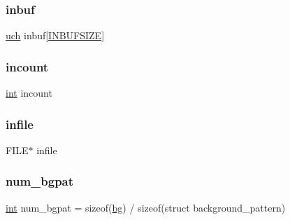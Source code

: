\mbox{\label{rpng2-x_8c_a82a0c3437e717af50ffb2c5244a611dd}} 
\subsubsection{\texorpdfstring{inbuf}{inbuf}}
{\footnotesize\ttfamily \mbox{\hyperlink{readpng_8h_af3307af5922c72924a837559c801a8a4}{uch}} inbuf\mbox{[}\mbox{\hyperlink{rpng2-x_8c_ab3f00dac33458432279d4308226d8413}{I\+N\+B\+U\+F\+S\+I\+ZE}}\mbox{]}\hspace{0.3cm}{\ttfamily [static]}}

\mbox{\label{rpng2-x_8c_aeb67c5d07a9a094de6dc172d6ef53766}} 
\subsubsection{\texorpdfstring{incount}{incount}}
{\footnotesize\ttfamily \mbox{\hyperlink{ioapi_8h_a787fa3cf048117ba7123753c1e74fcd6}{int}} incount\hspace{0.3cm}{\ttfamily [static]}}

\mbox{\label{rpng2-x_8c_af19157da745ecb3f2b088c8f3a10c0a7}} 
\subsubsection{\texorpdfstring{infile}{infile}}
{\footnotesize\ttfamily F\+I\+LE$\ast$ infile\hspace{0.3cm}{\ttfamily [static]}}

\mbox{\label{rpng2-x_8c_af61b351338b26840386fbab7f8214e53}} 
\subsubsection{\texorpdfstring{num\+\_\+bgpat}{num\_bgpat}}
{\footnotesize\ttfamily \mbox{\hyperlink{ioapi_8h_a787fa3cf048117ba7123753c1e74fcd6}{int}} num\+\_\+bgpat = sizeof(\mbox{\hyperlink{rpng2-x_8c_a808fa6d3573a86afa3ba7698a65b1ef6}{bg}}) / sizeof(struct background\+\_\+pattern)\hspace{0.3cm}{\ttfamily [static]}}

